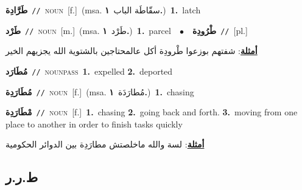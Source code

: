 \documentclass[10pt,a4paper,twoside]{article} %
\begin{document}
\begin{multicols}{2}
{\setlength\topsep{0pt}\textbf{\foreignlanguage{arabic}{طَرَّادِة}}\ {\color{gray}\texttt{//}\color{black}}\ \textsc{noun}\ [f.]\ \color{gray}(msa. \foreignlanguage{arabic}{سقّاطَة الباب}~\foreignlanguage{arabic}{\textbf{١.}})\color{black}\ \textbf{1.}~latch\ } \vspace{2mm}

{\setlength\topsep{0pt}\textbf{\foreignlanguage{arabic}{طَرْد}}\ {\color{gray}\texttt{//}\color{black}}\ \textsc{noun}\ [m.]\ \color{gray}(msa. \foreignlanguage{arabic}{طَرْد}~\foreignlanguage{arabic}{\textbf{١.}})\color{black}\ \textbf{1.}~parcel\ \ $\bullet$\ \ \setlength\topsep{0pt}\textbf{\foreignlanguage{arabic}{طْرُودِة}}\ {\color{gray}\texttt{//}\color{black}}\ [pl.]\  \begin{flushright}\color{gray}\foreignlanguage{arabic}{\textbf{\underline{\foreignlanguage{arabic}{أمثلة}}}: شفتهم بوزعوا طْرودِة أكل عالمحتاجين بالشتوية الله يجزيهم الخير}\end{flushright}\color{black}} \vspace{2mm}

{\setlength\topsep{0pt}\textbf{\foreignlanguage{arabic}{مُطَارَد}}\ {\color{gray}\texttt{//}\color{black}}\ \textsc{noun\textunderscore pass}\ \textbf{1.}~expelled  \textbf{2.}~deported\ } \vspace{2mm}

{\setlength\topsep{0pt}\textbf{\foreignlanguage{arabic}{مُطَارَدِة}}\ {\color{gray}\texttt{//}\color{black}}\ \textsc{noun}\ [f.]\ \color{gray}(msa. \foreignlanguage{arabic}{مُطارَدَة}~\foreignlanguage{arabic}{\textbf{١.}})\color{black}\ \textbf{1.}~chasing\ } \vspace{2mm}

{\setlength\topsep{0pt}\textbf{\foreignlanguage{arabic}{مْطَارَدِة}}\ {\color{gray}\texttt{//}\color{black}}\ \textsc{noun}\ [f.]\ \textbf{1.}~chasing  \textbf{2.}~going back and forth.  \textbf{3.}~moving from one place to another in order to finish tasks quickly\  \begin{flushright}\color{gray}\foreignlanguage{arabic}{\textbf{\underline{\foreignlanguage{arabic}{أمثلة}}}: لسة والله ماخلصتش مطارَدِة بين الدوائر الحكومية}\end{flushright}\color{black}} \vspace{2mm}

\vspace{-3mm}
\subsection*{\color{blue}\foreignlanguage{arabic}{ط.ر.ر}\color{blue}{}} 


\end{multicols}
\end{document}
